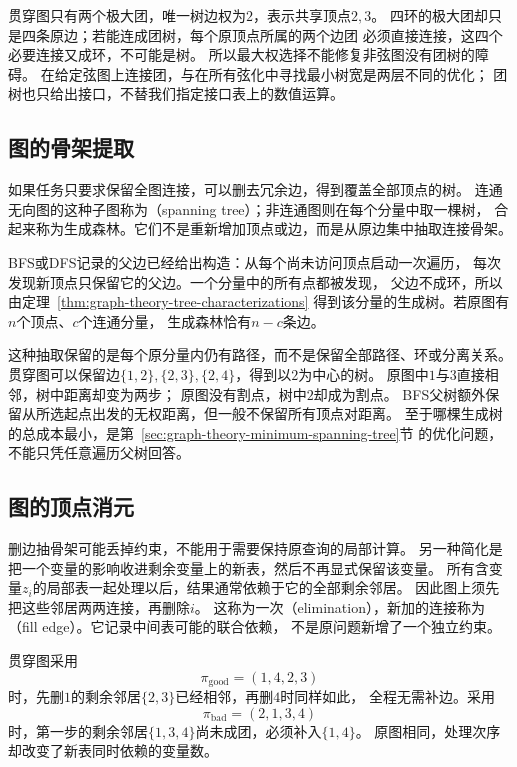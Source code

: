 贯穿图只有两个极大团，唯一树边权为\(2\)，表示共享顶点\(2,3\)。
四环的极大团却只是四条原边；若能连成团树，每个原顶点所属的两个边团
必须直接连接，这四个必要连接又成环，不可能是树。
所以最大权选择不能修复非弦图没有团树的障碍。
在给定弦图上连接团，与在所有弦化中寻找最小树宽是两层不同的优化；
团树也只给出接口，不替我们指定接口表上的数值运算。

\subsection{图的骨架提取}
\label{sec:graph-theory-spanning-skeleton}

如果任务只要求保留全图连接，可以删去冗余边，得到覆盖全部顶点的树。
连通无向图的这种子图称为（spanning tree）；非连通图则在每个分量中取一棵树，
合起来称为生成森林。它们不是重新增加顶点或边，而是从原边集中抽取连接骨架。

BFS或DFS记录的父边已经给出构造：从每个尚未访问顶点启动一次遍历，
每次发现新顶点只保留它的父边。一个分量中的所有点都被发现，
父边不成环，所以由定理~\ref{thm:graph-theory-tree-characterizations}
得到该分量的生成树。若原图有\(n\)个顶点、\(c\)个连通分量，
生成森林恰有\(n-c\)条边。

这种抽取保留的是每个原分量内仍有路径，而不是保留全部路径、环或分离关系。
贯穿图可以保留边\(\{1,2\},\{2,3\},\{2,4\}\)，得到以\(2\)为中心的树。
原图中\(1\)与\(3\)直接相邻，树中距离却变为两步；
原图没有割点，树中\(2\)却成为割点。
BFS父树额外保留从所选起点出发的无权距离，但一般不保留所有顶点对距离。
至于哪棵生成树的总成本最小，是第~\ref{sec:graph-theory-minimum-spanning-tree}节
的优化问题，不能只凭任意遍历父树回答。

\subsection{图的顶点消元}
\label{sec:graph-theory-elimination-width}

删边抽骨架可能丢掉约束，不能用于需要保持原查询的局部计算。
另一种简化是把一个变量的影响收进剩余变量上的新表，然后不再显式保留该变量。
所有含变量\(z_i\)的局部表一起处理以后，结果通常依赖于它的全部剩余邻居。
因此图上须先把这些邻居两两连接，再删除\(i\)。
这称为一次（elimination），新加的连接称为
（fill edge）。它记录中间表可能的联合依赖，
不是原问题新增了一个独立约束。

贯穿图采用
\[
  \pi_{\mathrm{good}}=(1,4,2,3)
\]
时，先删\(1\)的剩余邻居\(\{2,3\}\)已经相邻，再删\(4\)时同样如此，
全程无需补边。采用
\[
  \pi_{\mathrm{bad}}=(2,1,3,4)
\]
时，第一步的剩余邻居\(\{1,3,4\}\)尚未成团，必须补入\(\{1,4\}\)。
原图相同，处理次序却改变了新表同时依赖的变量数。

